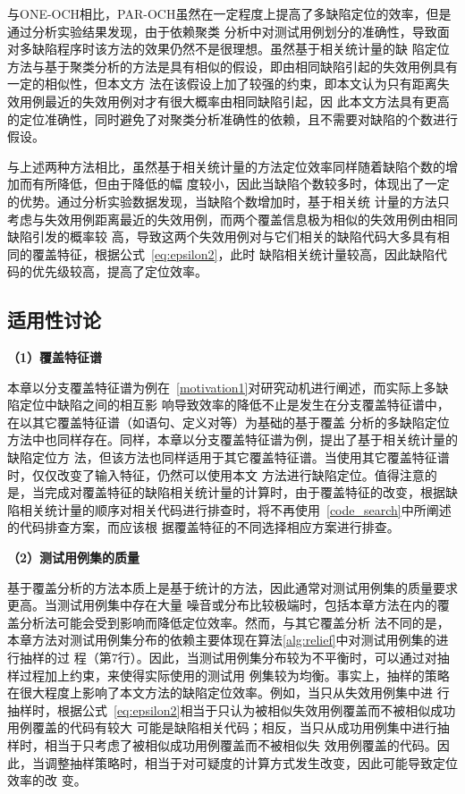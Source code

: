 与ONE-OCH相比，PAR-OCH虽然在一定程度上提高了多缺陷定位的效率，但是通过分析实验结果发现，由于依赖聚类
分析中对测试用例划分的准确性，导致面对多缺陷程序时该方法的效果仍然不是很理想。虽然基于相关统计量的缺
陷定位方法与基于聚类分析的方法是具有相似的假设，即由相同缺陷引起的失效用例具有一定的相似性，但本文方
法在该假设上加了较强的约束，即本文认为只有距离失效用例最近的失效用例对才有很大概率由相同缺陷引起，因
此本文方法具有更高的定位准确性，同时避免了对聚类分析准确性的依赖，且不需要对缺陷的个数进行假设。

与上述两种方法相比，虽然基于相关统计量的方法定位效率同样随着缺陷个数的增加而有所降低，但由于降低的幅
度较小，因此当缺陷个数较多时，体现出了一定的优势。通过分析实验数据发现，当缺陷个数增加时，基于相关统
计量的方法只考虑与失效用例距离最近的失效用例，而两个覆盖信息极为相似的失效用例由相同缺陷引发的概率较
高，导致这两个失效用例对与它们相关的缺陷代码大多具有相同的覆盖特征，根据公式~\eqref{eq:epsilon2}，此时
缺陷相关统计量较高，因此缺陷代码的优先级较高，提高了定位效率。

\subsection{适用性讨论}

\textbf{（1）覆盖特征谱}

本章以分支覆盖特征谱为例在~\ref{motivation1}对研究动机进行阐述，而实际上多缺陷定位中缺陷之间的相互影
响导致效率的降低不止是发生在分支覆盖特征谱中，在以其它覆盖特征谱（如语句、定义对等）为基础的基于覆盖
分析的多缺陷定位方法中也同样存在。同样，本章以分支覆盖特征谱为例，提出了基于相关统计量的缺陷定位方
法，但该方法也同样适用于其它覆盖特征谱。当使用其它覆盖特征谱时，仅仅改变了输入特征，仍然可以使用本文
方法进行缺陷定位。值得注意的是，当完成对覆盖特征的缺陷相关统计量的计算时，由于覆盖特征的改变，根据缺
陷相关统计量的顺序对相关代码进行排查时，将不再使用~\ref{code_search}中所阐述的代码排查方案，而应该根
据覆盖特征的不同选择相应方案进行排查。

\textbf{（2）测试用例集的质量}

基于覆盖分析的方法本质上是基于统计的方法，因此通常对测试用例集的质量要求更高。当测试用例集中存在大量
噪音或分布比较极端时，包括本章方法在内的覆盖分析法可能会受到影响而降低定位效率。然而，与其它覆盖分析
法不同的是，本章方法对测试用例集分布的依赖主要体现在算法\ref{alg:relief}中对测试用例集的进行抽样的过
程（第7行）。因此，当测试用例集分布较为不平衡时，可以通过对抽样过程加上约束，来使得实际使用的测试用
例集较为均衡。事实上，抽样的策略在很大程度上影响了本文方法的缺陷定位效率。例如，当只从失效用例集中进
行抽样时，根据公式~\eqref{eq:epsilon2}相当于只认为被相似失效用例覆盖而不被相似成功用例覆盖的代码有较大
可能是缺陷相关代码；相反，当只从成功用例集中进行抽样时，相当于只考虑了被相似成功用例覆盖而不被相似失
效用例覆盖的代码。因此，当调整抽样策略时，相当于对可疑度的计算方式发生改变，因此可能导致定位效率的改
变。


